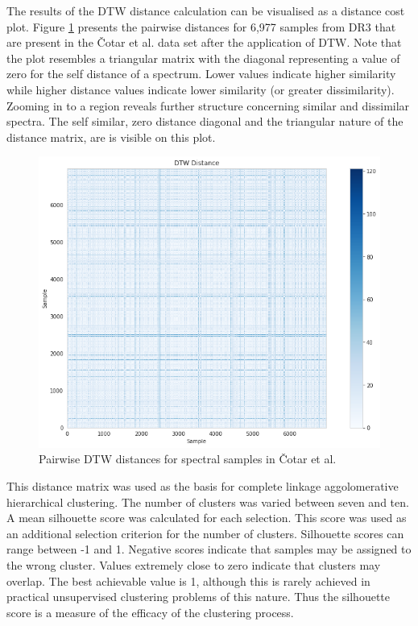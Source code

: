 The results of the DTW distance calculation can be visualised as a distance cost plot. Figure \ref{fig4.3} presents the pairwise distances for 6,977 samples from DR3 that are present in the Čotar et al. data set after the application of DTW. Note that the plot resembles a triangular matrix with the diagonal representing a value of zero for the self distance of a spectrum. Lower values indicate higher similarity while higher distance values indicate lower similarity (or greater dissimilarity). Zooming in to a region reveals further structure concerning similar and dissimilar spectra. The self similar, zero distance diagonal and the triangular nature of the distance matrix, are is visible on this plot.

\begin{figure}[!htb]
\centering
\includegraphics[scale=0.60]{figures/dtw cotar.png}
\caption{Pairwise DTW distances for spectral samples in Čotar et al.}
\label{fig4.3}
\end{figure}

This distance matrix was used as the basis for complete linkage aggolomerative hierarchical clustering. The number of clusters was varied between seven and ten. A mean silhouette score was calculated for each selection. This score was used as an additional selection criterion for the number of clusters. Silhouette scores can range between -1 and 1. Negative scores indicate that samples may be assigned to the wrong cluster. Values extremely close to zero indicate that clusters may overlap. The best achievable value is 1, although this is rarely achieved in practical unsupervised clustering problems of this nature. Thus the silhouette score is a measure of the efficacy of the clustering process.

